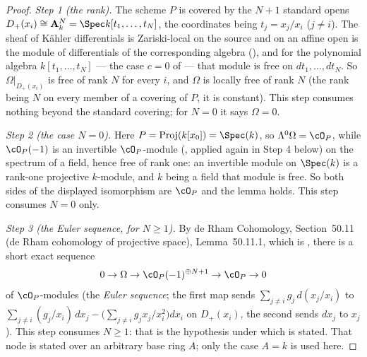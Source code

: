 \begin{proof}
\emph{Step 1 (the rank).}  The scheme $P$ is covered by the $N+1$
standard opens $D_+(x_i)\cong\mathbf A^N_k=\Spec k[t_1,\dots,t_N]$,
the coordinates being $t_j=x_j/x_i$ ($j\neq i$).  The sheaf of Kähler
differentials is Zariski-local on the source and on an affine open is
the module of differentials of the corresponding algebra
(), and for the polynomial algebra
$k[t_1,\dots,t_N]$ --- the case $c=0$ of 
--- that module is free on $dt_1,\dots,dt_N$.  So
$\Omega|_{D_+(x_i)}$ is free of rank $N$ for every $i$, and $\Omega$
is locally free of rank $N$ (the rank being $N$ on every member of a
covering of $P$, it is constant).  This step consumes nothing beyond
the standard covering; for $N=0$ it says $\Omega=0$.

\emph{Step 2 (the case $N=0$).}  Here
$P=\operatorname{Proj}(k[x_0])=\Spec(k)$, so
$\Lambda^{0}\Omega=\cO_P$, while $\cO_P(-1)$ is an invertible
$\cO_P$-module (, applied again in
Step 4 below) on the spectrum of a field, hence free of rank one: an
invertible module on
$\Spec(k)$ is a rank-one projective $k$-module, and $k$ being a field
that module is free.  So both sides of the displayed isomorphism are
$\cO_P$ and the lemma holds.  This step consumes $N=0$ only.

\emph{Step 3 (the Euler sequence, for $N\ge1$).}  By de Rham
Cohomology, Section~50.11 (de Rham cohomology of projective space),
Lemma~50.11.1, which is , there is a short
exact sequence
\[
0\to\Omega\to\cO_P(-1)^{\oplus N+1}\to\cO_P\to0
\]
of $\cO_P$-modules (the \emph{Euler sequence}; the first map sends
$\sum_{j\neq i}g_j\,d(x_j/x_i)$ to
$\sum_{j\neq i}(g_j/x_i)\,dx_j-\bigl(\sum_{j\neq i}g_jx_j/x_i^2\bigr)dx_i$
on $D_+(x_i)$, the second sends $dx_j$ to $x_j$).  This step consumes
$N\ge1$: that is the hypothesis under which
 is stated.  That node is stated over an
arbitrary base ring $A$; only the case $A=k$ is used here.


\end{proof}

